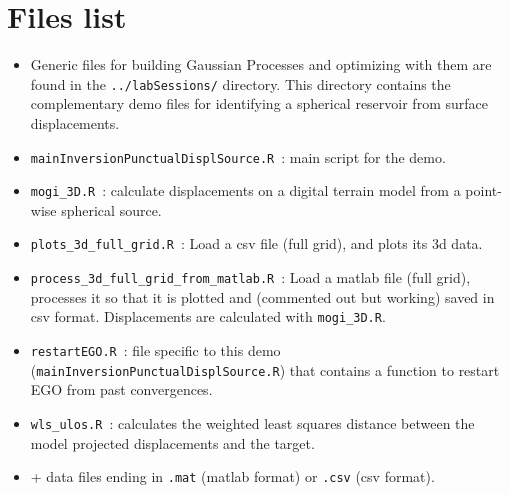 \documentclass[12pt]{article}
\begin{document}
\section{Files list}
\begin{itemize}
\item Generic files for building Gaussian Processes and optimizing with them are found in the \texttt{../labSessions/} directory. This directory
contains the complementary demo files for identifying a spherical reservoir from surface displacements.
\item \texttt{mainInversionPunctualDisplSource.R}~: main script for the demo.
\item \texttt{mogi\_3D.R}~: calculate displacements on a digital terrain model from a point-wise spherical source.
\item \texttt{plots\_3d\_full\_grid.R}~: Load a csv file (full grid), and plots its 3d data.
\item \texttt{process\_3d\_full\_grid\_from\_matlab.R}~: Load a matlab file (full grid), processes it so that it is plotted and (commented out but working) saved in csv format. Displacements are calculated with \texttt{mogi\_3D.R}.
\item \texttt{restartEGO.R}~: file specific to this demo (\texttt{mainInversionPunctualDisplSource.R}) that contains a function to restart EGO from past convergences.
\item \texttt{wls\_ulos.R}~: calculates the weighted least squares distance between the model projected displacements and the target.
\item + data files ending in \texttt{.mat} (matlab format) or \texttt{.csv} (csv format).
\end{itemize}


\end{document}
